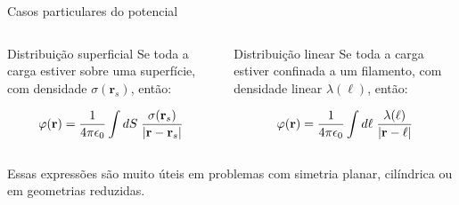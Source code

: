 \documentclass[aspectratio=169,11pt]{beamer}
\newcommand{\rr}{\mathbf{r}}
\begin{document}
\begin{frame}{Casos particulares do potencial}
\begin{columns}[T,onlytextwidth]
\begin{block}{Distribuição superficial}
Se toda a carga estiver sobre uma superfície, com densidade \(\sigma(\rr_s)\), então:
\begin{eqbox}
\begin{equation}
\varphi(\rr)=
\frac{1}{4\pi\epsilon_0}
\int dS\;
\frac{\sigma(\rr_s)}{\abs{\rr-\rr_s}}
\label{eq:3.12}
\end{equation}
\end{eqbox}
\end{block}

\begin{block}{Distribuição linear}
Se toda a carga estiver confinada a um filamento, com densidade linear \(\lambda(\ell)\), então:
\begin{eqbox}
\begin{equation}
\varphi(\rr)=
\frac{1}{4\pi\epsilon_0}
\int d\ell\;
\frac{\lambda(\ell)}{\abs{\rr-\ell}}
\label{eq:3.13}
\end{equation}
\end{eqbox}
\end{block}
\end{columns}

\vspace{0.2cm}

\begin{mybox}
\justifying
Essas expressões são muito úteis em problemas com simetria planar, cilíndrica ou em geometrias reduzidas.
\end{mybox}
\end{frame}
\end{document}
